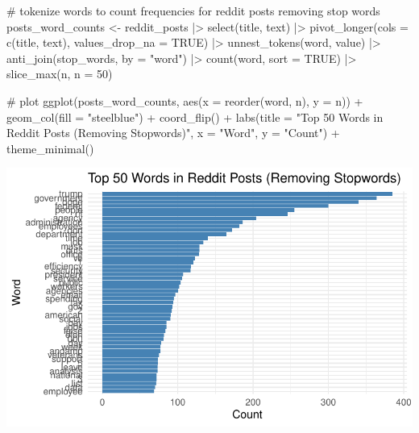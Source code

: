 \documentclass[
  letterpaper,
  DIV=11,
  numbers=noendperiod]{scrartcl}
\newenvironment{Shaded}{\begin{snugshade}}{\end{snugshade}}
\newcommand{\AttributeTok}[1]{\textcolor[rgb]{0.40,0.45,0.13}{#1}}
\newcommand{\CommentTok}[1]{\textcolor[rgb]{0.37,0.37,0.37}{#1}}
\newcommand{\ConstantTok}[1]{\textcolor[rgb]{0.56,0.35,0.01}{#1}}
\newcommand{\DecValTok}[1]{\textcolor[rgb]{0.68,0.00,0.00}{#1}}
\newcommand{\FunctionTok}[1]{\textcolor[rgb]{0.28,0.35,0.67}{#1}}
\newcommand{\NormalTok}[1]{\textcolor[rgb]{0.00,0.23,0.31}{#1}}
\newcommand{\OtherTok}[1]{\textcolor[rgb]{0.00,0.23,0.31}{#1}}
\newcommand{\SpecialCharTok}[1]{\textcolor[rgb]{0.37,0.37,0.37}{#1}}
\newcommand{\StringTok}[1]{\textcolor[rgb]{0.13,0.47,0.30}{#1}}
\begin{document}
\begin{Shaded}
\begin{Highlighting}[]
\CommentTok{\# tokenize words to count frequencies for reddit posts removing stop words}
\NormalTok{posts\_word\_counts }\OtherTok{\textless{}{-}}\NormalTok{ reddit\_posts }\SpecialCharTok{|\textgreater{}}
  \FunctionTok{select}\NormalTok{(title, text) }\SpecialCharTok{|\textgreater{}}
  \FunctionTok{pivot\_longer}\NormalTok{(}\AttributeTok{cols =} \FunctionTok{c}\NormalTok{(title, text), }\AttributeTok{values\_drop\_na =} \ConstantTok{TRUE}\NormalTok{) }\SpecialCharTok{|\textgreater{}}
  \FunctionTok{unnest\_tokens}\NormalTok{(word, value) }\SpecialCharTok{|\textgreater{}}
  \FunctionTok{anti\_join}\NormalTok{(stop\_words, }\AttributeTok{by =} \StringTok{"word"}\NormalTok{) }\SpecialCharTok{|\textgreater{}}
  \FunctionTok{count}\NormalTok{(word, }\AttributeTok{sort =} \ConstantTok{TRUE}\NormalTok{) }\SpecialCharTok{|\textgreater{}}
  \FunctionTok{slice\_max}\NormalTok{(n, }\AttributeTok{n =} \DecValTok{50}\NormalTok{)}

\CommentTok{\# plot}
\FunctionTok{ggplot}\NormalTok{(posts\_word\_counts, }\FunctionTok{aes}\NormalTok{(}\AttributeTok{x =} \FunctionTok{reorder}\NormalTok{(word, n), }\AttributeTok{y =}\NormalTok{ n)) }\SpecialCharTok{+}
  \FunctionTok{geom\_col}\NormalTok{(}\AttributeTok{fill =} \StringTok{"steelblue"}\NormalTok{) }\SpecialCharTok{+}
  \FunctionTok{coord\_flip}\NormalTok{() }\SpecialCharTok{+}
  \FunctionTok{labs}\NormalTok{(}\AttributeTok{title =} \StringTok{"Top 50 Words in Reddit Posts (Removing Stopwords)"}\NormalTok{,}
       \AttributeTok{x =} \StringTok{"Word"}\NormalTok{,}
       \AttributeTok{y =} \StringTok{"Count"}\NormalTok{) }\SpecialCharTok{+}
  \FunctionTok{theme\_minimal}\NormalTok{()}
\end{Highlighting}
\end{Shaded}

\includegraphics{Reddit_eda_files/figure-pdf/unnamed-chunk-8-1.pdf}
\end{document}
